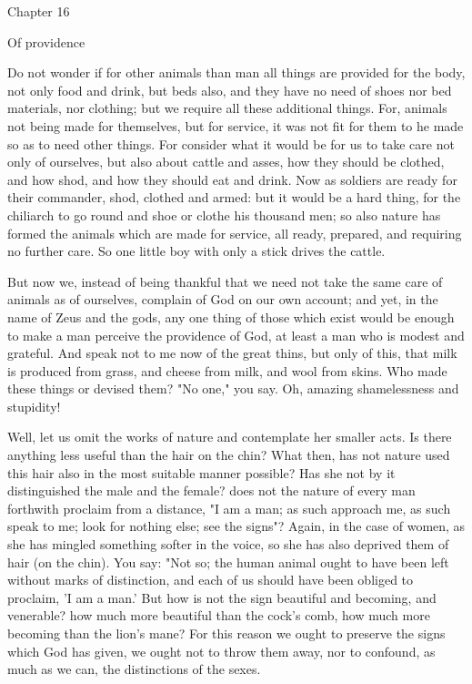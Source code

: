 \documentclass[a4paper]{article}
\begin{document}
Chapter 16

Of providence 

Do not wonder if for other animals than man all things are provided
for the body, not only food and drink, but beds also, and they have
no need of shoes nor bed materials, nor clothing; but we require all
these additional things. For, animals not being made for themselves,
but for service, it was not fit for them to he made so as to need
other things. For consider what it would be for us to take care not
only of ourselves, but also about cattle and asses, how they should
be clothed, and how shod, and how they should eat and drink. Now as
soldiers are ready for their commander, shod, clothed and armed: but
it would be a hard thing, for the chiliarch to go round and shoe or
clothe his thousand men; so also nature has formed the animals which
are made for service, all ready, prepared, and requiring no further
care. So one little boy with only a stick drives the cattle.

But now we, instead of being thankful that we need not take the same
care of animals as of ourselves, complain of God on our own account;
and yet, in the name of Zeus and the gods, any one thing of those
which exist would be enough to make a man perceive the providence
of God, at least a man who is modest and grateful. And speak not to
me now of the great thins, but only of this, that milk is produced
from grass, and cheese from milk, and wool from skins. Who made these
things or devised them? "No one," you say. Oh, amazing shamelessness
and stupidity! 

Well, let us omit the works of nature and contemplate her smaller
acts. Is there anything less useful than the hair on the chin? What
then, has not nature used this hair also in the most suitable manner
possible? Has she not by it distinguished the male and the female?
does not the nature of every man forthwith proclaim from a distance,
"I am a man; as such approach me, as such speak to me; look for nothing
else; see the signs"? Again, in the case of women, as she has mingled
something softer in the voice, so she has also deprived them of hair
(on the chin). You say: "Not so; the human animal ought to have been
left without marks of distinction, and each of us should have been
obliged to proclaim, 'I am a man.' But how is not the sign beautiful
and becoming, and venerable? how much more beautiful than the cock's
comb, how much more becoming than the lion's mane? For this reason
we ought to preserve the signs which God has given, we ought not to
throw them away, nor to confound, as much as we can, the distinctions
of the sexes. 
\end{document}
